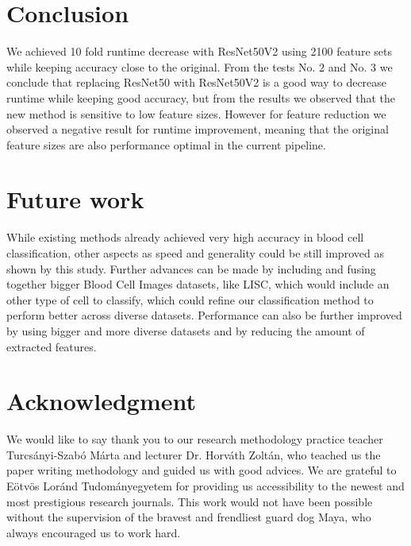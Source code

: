 \documentclass[conference]{IEEEtran}
\begin{document}
\section{Conclusion}

We achieved 10 fold runtime decrease with ResNet50V2 using 2100 feature sets while keeping accuracy close to the original.
From the tests No. 2 and No. 3 we conclude that replacing ResNet50 with ResNet50V2 is a good way to decrease runtime while keeping good accuracy, but from the results we observed that the new method is sensitive to low feature sizes.
However for feature reduction we observed a negative result for runtime improvement, meaning that the original feature sizes are also performance optimal in the current pipeline.

\section{Future work}

While existing methods already achieved very high accuracy in blood cell classification, other aspects as speed and generality could be still improved as shown by this study. 
Further advances can be made by including and fusing together bigger Blood Cell Images datasets, like LISC, which would include an other type of cell to classify, which could refine our classification method to perform better across diverse datasets.
Performance can also be further improved by using bigger and more diverse datasets and by reducing the
amount of extracted features.

\section*{Acknowledgment}

We would like to say thank you to our research methodology practice teacher Turcsányi-Szabó Márta and lecturer Dr. Horváth Zoltán, who teached us the paper writing methodology and guided us with good advices.
We are grateful to Eötvös Loránd Tudományegyetem for providing us accessibility to the newest and most prestigious research journals.
This work would not have been possible without the supervision of the bravest and frendliest guard dog Maya, who always encouraged us to work hard.
\end{document}
